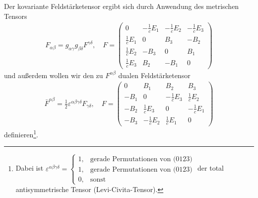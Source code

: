 Der kovariante Feldstärketensor ergibt sich durch Anwendung des metrischen Tensors
\begin{align*}
    F_{\alpha\beta} = g_{\alpha\gamma}g_{\beta\delta} F^{\gamma\delta}, \quad
    F=\begin{pmatrix}
          0              & -\frac{1}{c}E_1 & -\frac{1}{c}E_2 & -\frac{1}{c}E_3 \\
          \frac{1}{c}E_1 & 0               & B_3             & -B_2            \\
          \frac{1}{c}E_2 & -B_3            & 0               & B_1             \\
          \frac{1}{c}E_3 & B_2             & -B_1            & 0
      \end{pmatrix}
\end{align*}
und außerdem wollen wir den zu $F^{\alpha\beta}$ dualen Feldstärketensor
\begin{align*}
    \bar F^{\alpha\beta} = \frac{1}{2} \varepsilon^{\alpha\beta\gamma\delta} F_{\gamma\delta}, \quad
    F=\begin{pmatrix}
          0    & B_1             & B_2             & B_3             \\
          -B_1 & 0               & -\frac{1}{c}E_3 & \frac{1}{c}E_2  \\
          -B_2 & \frac{1}{c}E_3  & 0               & -\frac{1}{c}E_1 \\
          -B_3 & -\frac{1}{c}E_2 & \frac{1}{c}E_1  & 0
      \end{pmatrix}
\end{align*}
definieren\footnote{Dabei ist $\varepsilon^{\alpha\beta\gamma\delta}=\begin{cases}1,&\text{gerade Permutationen von (0123)}\\1,&\text{gerade Permutationen von (0123)}\\0,& \mathrm{sonst}\end{cases}$ der total antisymmetrische Tensor (Levi-Civita-Tensor).}.

